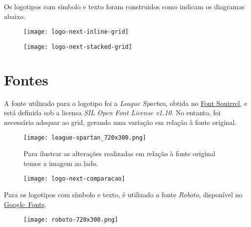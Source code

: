 \documentclass{manualmarca}
\begin{document}
Os logotipos com símbolo e texto foram construidos como indicam os diagramas abaixo.

\begin{figure}[!htp]
  \centering
  \texttt{[image: logo-next-inline-grid]}
\end{figure}

\begin{figure}[!htp]
  \centering
  \texttt{[image: logo-next-stacked-grid]}
\end{figure}

\pagebreak[4]
\section{Fontes}
\label{sec:fontes-padrao}

A fonte utilizado para o logotipo foi a \emph{League Spartan}, obtida no \href{https://www.fontsquirrel.com/fonts/league-spartan}{Font Squirrel}, e está definida sob a licensa \emph{SIL Open Font License v1.10}. No entanto, foi necessário adequar ao grid, gerando uma variação em relação à fonte original.

\begin{figure}[!htp]
  \centering
  \texttt{[image: league-spartan\_720x300.png]}
\end{figure}

\begin{figure}[!htp]
  \centering
  \begin{minipage}[l]{.32\textwidth}
    Para ilustrar as alterações realizadas em relação à fonte original temos a imagem ao lado.
  \end{minipage}%
  \hfill%
  \begin{minipage}[r]{.6\textwidth}
    \centering
    \texttt{[image: logo-next-comparacao]}
  \end{minipage}
\end{figure}

Para os logotipos com símbolo e texto, é utilizado a fonte \emph{Roboto}, disponível no \href{https://fonts.google.com/specimen/Roboto}{Google~Fonts}.

\begin{figure}[!htp]
  \centering
  \texttt{[image: roboto-720x300.png]}
\end{figure}

\pagebreak[4]
\end{document}
